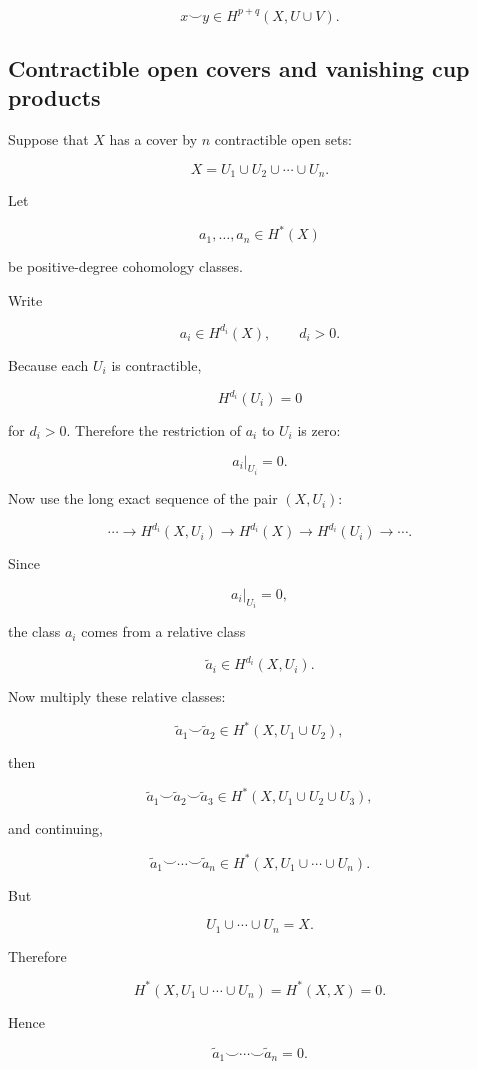 \documentclass[12pt,a4paper]{article}
\theoremstyle{notespace}
\begin{document}
\[
\boxed{
	x\smile y\in H^{p+q}(X,U\cup V).
}
\]

\subsection{Contractible open covers and vanishing cup products}

Suppose that \(X\) has a cover by \(n\) contractible open sets:

\[
X=U_1\cup U_2\cup\cdots\cup U_n.
\]

Let

\[
a_1,\dots,a_n\in H^*(X)
\]

be positive-degree cohomology classes.

Write

\[
a_i\in H^{d_i}(X),
\qquad
d_i>0.
\]

Because each \(U_i\) is contractible,

\[
H^{d_i}(U_i)=0
\]

for \(d_i>0\). Therefore the restriction of \(a_i\) to \(U_i\) is zero:

\[
a_i|_{U_i}=0.
\]

Now use the long exact sequence of the pair \((X,U_i)\):

\[
\cdots
\longrightarrow
H^{d_i}(X,U_i)
\longrightarrow
H^{d_i}(X)
\longrightarrow
H^{d_i}(U_i)
\longrightarrow
\cdots .
\]

Since

\[
a_i|_{U_i}=0,
\]

the class \(a_i\) comes from a relative class

\[
\widetilde a_i\in H^{d_i}(X,U_i).
\]

Now multiply these relative classes:

\[
\widetilde a_1\smile \widetilde a_2
\in
H^*(X,U_1\cup U_2),
\]

then

\[
\widetilde a_1\smile\widetilde a_2\smile\widetilde a_3
\in
H^*(X,U_1\cup U_2\cup U_3),
\]

and continuing,

\[
\widetilde a_1\smile\cdots\smile \widetilde a_n
\in
H^*(X,U_1\cup\cdots\cup U_n).
\]

But

\[
U_1\cup\cdots\cup U_n=X.
\]

Therefore

\[
H^*(X,U_1\cup\cdots\cup U_n)
=
H^*(X,X)
=
0.
\]

Hence

\[
\widetilde a_1\smile\cdots\smile \widetilde a_n=0.
\]
\end{document}
